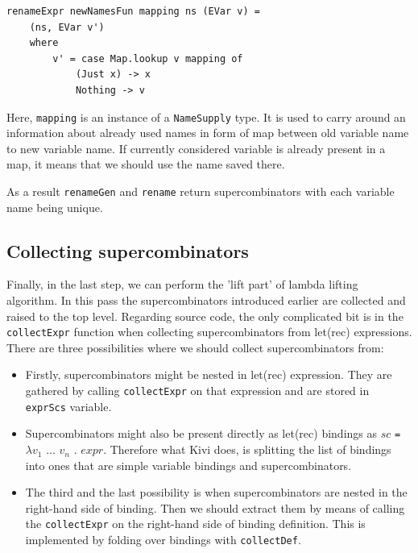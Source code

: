 \documentclass[12pt,a4paper]{report}
\begin{document}
\vspace*{0.2in}
\begin{lstlisting}[style=haskell]
renameExpr newNamesFun mapping ns (EVar v) =
    (ns, EVar v')
    where
        v' = case Map.lookup v mapping of
            (Just x) -> x
            Nothing -> v
\end{lstlisting}

Here, \texttt{mapping} is an instance of a \texttt{NameSupply} type. It is used
to carry around an information about already used names in form of map between
old variable name to new variable name. If currently considered variable is
already present in a map, it means that we should use the name saved there.

As a result \texttt{renameGen} and \texttt{rename} return supercombinators with
each variable name being unique.

\subsection{Collecting supercombinators}
Finally, in the last step, we can perform the 'lift part' of lambda lifting
algorithm. In this pass the supercombinators introduced earlier are collected
and raised to the top level.  Regarding source code, the only complicated bit
is in the \texttt{collectExpr} function when collecting supercombinators from
let(rec) expressions.  There are three possibilities where we should
collect supercombinators from:

\begin{itemize}
  \item Firstly, supercombinators might be nested in let(rec)
    expression. They are gathered by calling \texttt{collectExpr} on that
    expression and are stored in \texttt{exprScs} variable.
  \item Supercombinators might also be present directly as let(rec)
    bindings as $sc$ \texttt{=} $\lambda v_1$ $\ldots$ $v_n$ . $expr$.
    Therefore what Kivi does, is splitting the list of bindings into ones that
    are simple variable bindings and supercombinators.
  \item The third and the last possibility is when supercombinators are nested
    in the right-hand side of binding. Then we should extract them by means of
    calling the \texttt{collectExpr} on the right-hand side of binding
    definition. This is implemented by folding over bindings with
    \texttt{collectDef}.
\end{itemize}
\end{document}
